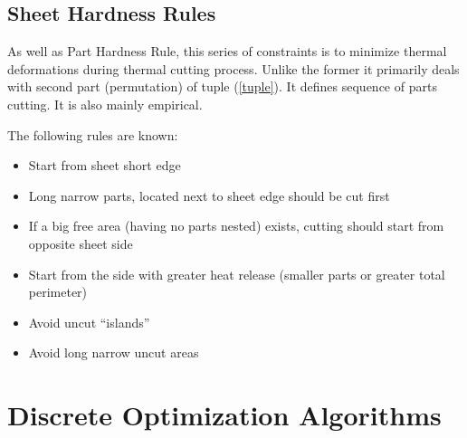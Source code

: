 \documentclass{../download/tPRS2e}
\begin{document}
\subsection{Sheet Hardness Rules}

As well as Part Hardness Rule, this series of constraints is to minimize thermal deformations during thermal cutting process.
Unlike the former it primarily deals with second part (permutation) of tuple (\ref{tuple}).
It defines sequence of parts cutting. It is also mainly empirical.

The following rules are known:

\begin{itemize}
\item Start from sheet short edge
\item Long narrow parts, located next to sheet edge should be cut first
\item If a big free area (having no parts nested) exists, cutting should start from opposite sheet side
\item Start from the side with greater heat release (smaller parts or greater total perimeter)
\item Avoid uncut “islands”
\item Avoid long narrow uncut areas
\end{itemize}

\section{Discrete Optimization Algorithms}
\end{document}
